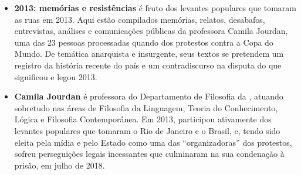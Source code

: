 \begin{itemize}
\item \textbf{2013: memórias e resistências} é fruto dos levantes populares que tomaram as ruas em 2013. Aqui estão compilados memórias, relatos, desabafos, entrevistas, análises e comunicações públicas da professora Camila Jourdan, uma das 23 pessoas processadas quando dos protestos contra a Copa do Mundo. De temática anarquista e insurgente, seus textos se pretendem um registro da história recente do país e um contradiscurso na disputa do que significou e legou 2013.
  
\item \textbf{Camila Jourdan} é professora do Departamento de Filosofia da ,
atuando sobretudo nas áreas de Filosofia da Linguagem, Teoria do Conhecimento, Lógica
e Filosofia Contemporânea. Em 2013, participou ativamente dos levantes populares que
tomaram o Rio de Janeiro e o Brasil, e, tendo sido eleita pela mídia e pelo Estado como
uma das ``organizadoras'' dos protestos, sofreu perseguições legais incessantes que culminaram
na sua condenação à prisão, em julho de 2018.
\end{itemize}

